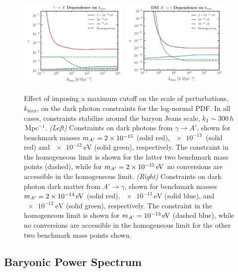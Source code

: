 \documentclass[prd,aps,10pt,nofootinbib,twocolumn,superscriptaddress,preprintnumbers,balancelastpage,longbibliography]{revtex4-1}
\begin{document}
%
\begin{figure}[tbp]
    \centering
    \includegraphics[width=0.47\textwidth]{plots/limit_dp_k_max}
    \includegraphics[width=0.47\textwidth]{plots/limit_DP_DM_k_max}
    \caption{Effect of imposing a maximum cutoff on the scale of perturbations, $k_\mathrm{max}$, on the dark photon constraints for the log-normal PDF. In all cases, constraints stabilize around the baryon Jeans scale, $k_\mathrm{J}\sim 300\,h$\,Mpc$^{-1}$. \emph{(Left)} Constraints on dark photons from $\gamma\to A'$, shown for benchmark masses $m_{A^\prime} = \SI{2e-15}{}$ (solid red), $\SI{e-13}{}$ (solid red) and $\SI{e-12}{\eV}$ (solid green), respectively. The constraint in the homogeneous limit is shown for the latter two benchmark mass points (dashed), while for $\mAp = \SI{2e-15}{\eV}$ no conversions are accessible in the homogeneous limit.  \emph{(Right)} Constraints on dark photon dark matter from $A'\to \gamma$, shown for benchmark masses $\mAp = \SI{2e-14}{\eV}$ (solid red), $\SI{e-13}{\eV}$ (solid blue), and $\SI{e-12}{\eV}$ (solid green), respectively. The constraint in the homogeneous limit is shown for $\mAp = \SI{e-13}{\eV}$ (dashed blue), while no conversions are accessible in the homogeneous limit for the other two benchmark mass points shown.  } 
    \label{fig:limit_k_max_dep}
\end{figure}
%

\subsection{Baryonic Power Spectrum}
\end{document}

